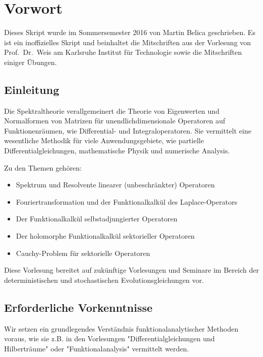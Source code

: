 
\chapter*{Vorwort}
Dieses Skript wurde im Sommersemester 2016
von Martin Belica geschrieben. Es ist ein inoffizielles Skript und beinhaltet die Mitschriften aus der Vorlesung von Prof.~Dr.~Weis am Karlsruhe Institut für Technologie sowie die Mitschriften einiger Übungen.

\thispagestyle{empty}

\section*{Einleitung}

Die Spektraltheorie verallgemeinert die Theorie von Eigenwerten und Normalformen von Matrizen für unendlichdimensionale Operatoren auf Funktionenräumen, wie Differential- und Integraloperatoren. Sie vermittelt eine wesentliche Methodik für viele Anwendungsgebiete, wie partielle Differentialgleichungen, mathematische Physik und numerische Analysis.

Zu den Themen gehören:

  \begin{itemize}
     \item Spektrum und Resolvente linearer (unbeschränkter) Operatoren
     \item Fouriertransformation und der Funktionalkalkül des Laplace-Operators
     \item Der Funktionalkalkül selbstadjungierter Operatoren
     \item Der holomorphe Funktionalkalkül sektorieller Operatoren
     \item Cauchy-Problem für sektorielle Operatoren
  \end{itemize}
  
Diese Vorlesung bereitet auf zukünftige Vorlesungen und Seminare im Bereich der deterministischen und stochastischen Evolutionsgleichungen vor.

\section*{Erforderliche Vorkenntnisse}
Wir setzen ein grundlegendes Verständnis funktionalanalytischer Methoden voraus, wie sie z.B. in den Vorlesungen "Differentialgleichungen und Hilberträume" oder "Funktionalanalysis" vermittelt werden.


\begin{center}	

\end{center}